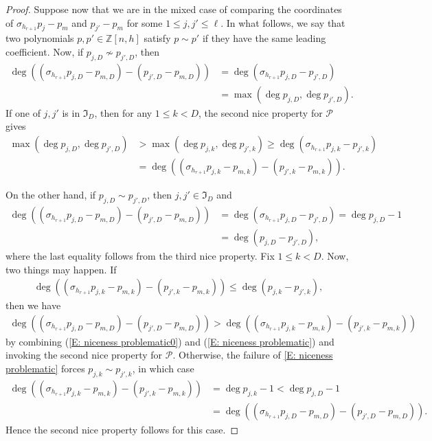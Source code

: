 \documentclass[11pt]{amsart}
\theoremstyle{definition}
\newcommand{\Z}{{\mathbb Z}}
\newcommand{\CP}{{\mathcal P}}
\newcommand{\FI}{{\mathfrak I}}
\newcommand{\1}{{\mathbf{1}}}
\newcommand{\brac}[1]{\mathopen{}\left( #1 \mathclose{}\right)}
\begin{document}
\begin{proof}
    Suppose now that we are in the mixed case of comparing the coordinates of $\sigma_{h_{r+1}}p_{j}-p_{m}$ and $p_{j'}-p_m$ for some $1\leq j,j'\leq \ell$. In what follows, we say that two polynomials $p,p'\in\Z[n,h]$ satisfy $p\sim p'$ if they have the same leading coefficient. Now, if $p_{j,D}\not\sim p_{j',D}$, then
    \begin{align*}
        \deg \brac{(\sigma_{h_{r+1}}p_{j,D}-p_{m,D}) - (p_{j',D}-p_{m,D})} &= \deg (\sigma_{h_{r+1}}p_{j,D}-p_{j',D})\\
        &= \max(\deg p_{j,D}, \deg p_{j',D}).
    \end{align*}
    If one of $j,j'$ is in $\FI_D$, then for any  $1\leq k<D$, the second nice property for $\CP$ gives
    \begin{align*}
        \max(\deg p_{j,D},\deg p_{j',D}) &>\max(\deg p_{j,k}, \deg p_{j',k}) \geq \deg ({\sigma_{h_{r+1}}}p_{j,k}- p_{j',k})\\
        &={\deg\brac{(\sigma_{h_{r+1}}p_{j,k}-p_{m,k}) - (p_{j',k}-p_{m,k})}}.
    \end{align*}
    
     On the other hand, if $p_{j,D}\sim p_{j',D}$, then $j,j'\in\FI_D$ and
    \begin{align}\label{E: niceness problematic0}
        \deg \brac{(\sigma_{h_{r+1}}p_{j,D}-p_{m,D}) - (p_{j',D}-p_{m,D})} &= \deg (\sigma_{h_{r+1}}p_{j,D}-p_{j',D})= \deg p_{j,D}-1\\\nonumber
        &= \deg (p_{j,D}-p_{j',D}),
    \end{align} 
    where the last equality follows from the third nice property.
    Fix $1\leq k<D$. Now, two things may happen. If 
    \begin{align}\label{E: niceness problematic}
        \deg \brac{(\sigma_{h_{r+1}}p_{j,k}-p_{m,k}) - (p_{j',k}-p_{m,k})} \leq \deg (p_{j,k} -p_{j',k}),
    \end{align}
    then we have
     \begin{align}\label{E: niceness problematic2}
         \deg \brac{(\sigma_{h_{r+1}}p_{j,D}-p_{m,D}) - (p_{j',D}-p_{m,D})}>\deg \brac{(\sigma_{h_{r+1}}p_{j,k}-p_{m,k}) - (p_{j',k}-p_{m,k})}
    \end{align}
    by
     combining (\ref{E: niceness problematic0}) and (\ref{E: niceness problematic}) and invoking the second nice property for $\CP$. Otherwise, the failure of \eqref{E: niceness problematic} forces $p_{j,k}\sim p_{j',k}$, in which case
    \begin{align*}
        \deg \brac{(\sigma_{h_{r+1}}p_{j,k}-p_{m,k}) - (p_{j',k}-p_{m,k})}  &= \deg p_{j,k} - 1 < \deg p_{j,D} - 1\\
        &= \deg \brac{(\sigma_{h_{r+1}}p_{j,D}-p_{m,D}) - (p_{j',D}-p_{m,D})}.
    \end{align*}
    Hence the second nice property follows for this case. %


\end{proof}
\end{document}
